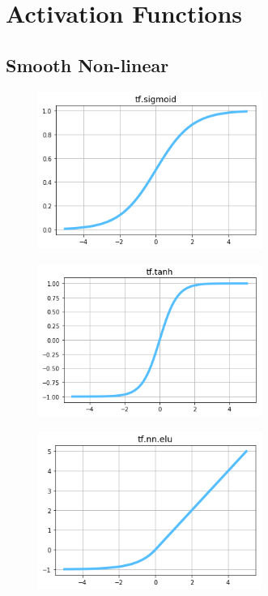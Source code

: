 \section{Activation Functions}

\subsection{Smooth Non-linear}

\begin{figure}
\centering
\includegraphics[width=0.65\textwidth]{./sync_imgs/act/smooth/sigmoid.png}
\label{fig:act_smooth_sigmoid}
\end{figure}

\begin{figure}
\centering
\includegraphics[width=0.65\textwidth]{./sync_imgs/act/smooth/tangent.png}
\label{fig:act_smooth_tangent}
\end{figure}

\begin{figure}
\centering
\includegraphics[width=0.65\textwidth]{./sync_imgs/act/smooth/elu.png}
\label{fig:act_smooth_elu}
\end{figure}


